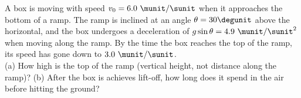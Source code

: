 A box is moving with speed $v_0 = 6.0\ \munit/\sunit$ when it
approaches the bottom of a ramp. The ramp is inclined at an angle
$\theta = 30\degunit$ above the horizontal, and the box undergoes a
deceleration of $g \sin \theta = 4.9\ \munit / \sunit^2$ when moving
along the ramp. By the time the box reaches the top of the ramp, its
speed has gone down to $3.0\ \munit / \sunit$.\\
%
(a) How high is the top of the ramp (vertical height, not distance
along the ramp)?\answercheck\hwendpart
%
(b) After the box is achieves lift-off, how long does it spend in the
air before hitting the ground?\answercheck
